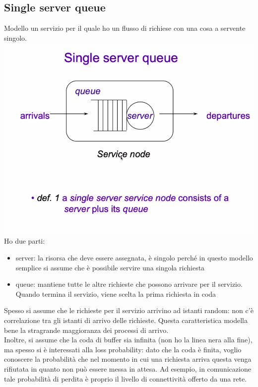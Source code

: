 \documentclass{article}
\begin{document}
\subsection{Single server queue}
Modello un servizio per il quale ho un flusso di richiese con una cosa a servente singolo.\\ 
\includegraphics[scale=0.2]{images/PMCSN-1.png}\\
Ho due parti:
\begin{itemize}
\item server: la risorsa che deve essere assegnata, è singolo perché in questo modello semplice si assume che è possibile servire una singola richiesta
\item queue: mantiene tutte le altre richieste che possono arrivare per il servizio. Quando termina il servizio, viene scelta la prima richiesta in coda
\end{itemize}
Spesso si assume che le richieste per il servizio arrivino ad istanti random: non c'è correlazione tra gli istanti di arrivo delle richieste. Questa caratteristica modella bene la stragrande maggioranza dei processi di arrivo.\\ Inoltre, si assume che la coda di buffer sia infinita (non ho la linea nera alla fine), ma spesso si è interessati alla loss probability: dato che la coda è finita, voglio conoscere la probabilità che nel momento in cui una richiesta arriva questa venga rifiutata in quanto non può essere messa in attesa. Ad esempio, in comunicazione tale probabilità di perdita è proprio il livello di connettività offerto da una rete.\\ 
\end{document}
